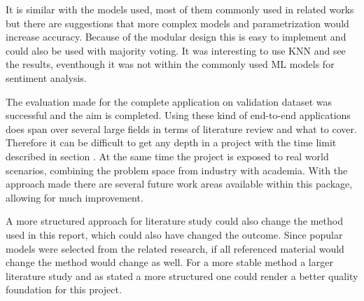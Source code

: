 It is similar with the models used, most of them commonly used in related works but there are suggestions that more complex models and parametrization would increase accuracy. 
Because of the modular design this is easy to implement and could also be used with majority voting. 
It was interesting to use KNN and see the results, eventhough it was not within the commonly used ML models for sentiment analysis. 


The evaluation made for the complete application on validation dataset was successful and the aim is completed. 
Using these kind of end-to-end applications does span over several large fields in terms of literature review and what to cover. 
Therefore it can be difficult to get any depth in a project with the time limit described in section . 
At the same time the project is exposed to real world scenarios, combining the problem space from industry with academia. 
With the approach made there are several future work areas available within this package, allowing for much improvement.


A more structured approach for literature study could also change the method used in this report, which could also have changed the outcome. 
Since popular models were selected from the related research, if all referenced material would change the method would change as well. 
For a more stable method a larger literature study and as stated a more structured one could render a better quality foundation for this project.